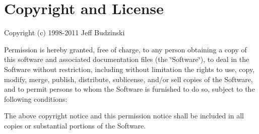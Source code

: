 \hypertarget{index_copyright_sec}{}\section{Copyright and License}\label{index_copyright_sec}
Copyright (c) 1998-\/2011 Jeff Budzinski

Permission is hereby granted, free of charge, to any person obtaining a copy of this software and associated documentation files (the \char`\"{}\-Software\char`\"{}), to deal in the Software without restriction, including without limitation the rights to use, copy, modify, merge, publish, distribute, sublicense, and/or sell copies of the Software, and to permit persons to whom the Software is furnished to do so, subject to the following conditions\-:

The above copyright notice and this permission notice shall be included in all copies or substantial portions of the Software.

